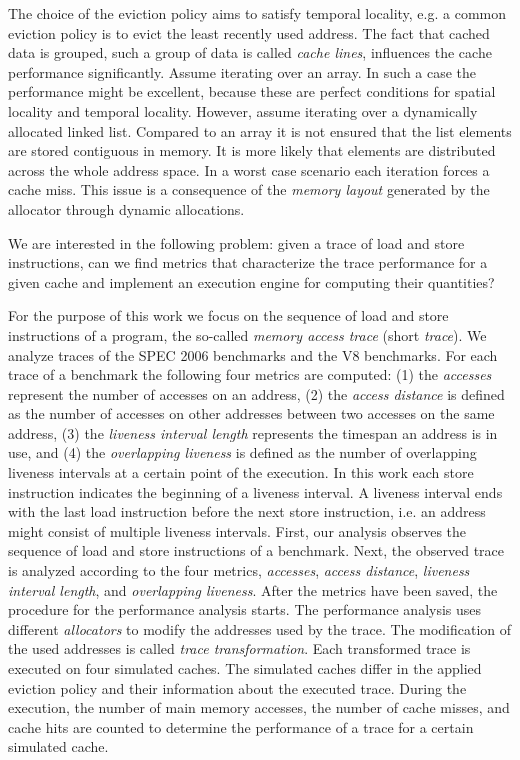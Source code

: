 \documentclass[onecolumn, openright, master, english, signatures]{dbrgrptt}
\begin{document}
The choice of the eviction policy aims to satisfy temporal locality, e.g. a common eviction policy is to evict the least recently used address.
%
The fact that cached data is grouped, such a group of data is called \emph{cache lines}, influences the cache performance significantly.
Assume iterating over an array.
In such a case the performance might be excellent, because these are perfect conditions for spatial locality and temporal locality.
However, assume iterating over a dynamically allocated linked list.
Compared to an array it is not ensured that the list elements are stored contiguous in memory.
It is more likely that elements are distributed across the whole address space.
In a worst case scenario each iteration forces a cache miss.
This issue is a consequence of the \emph{memory layout} generated by the allocator through dynamic allocations.

We are interested in the following problem: given a trace of load and store instructions, can we find metrics that characterize the trace performance for a given cache and implement an execution engine for computing their quantities?

For the purpose of this work we focus on the sequence of load and store instructions of a program, the so-called \emph{memory access trace} (short \emph{trace}).
We analyze traces of the SPEC 2006 benchmarks and the V8 benchmarks.
For each trace of a benchmark the following four metrics are computed:
(1) the \emph{accesses} represent the number of accesses on an address,
(2) the \emph{access distance} is defined as the number of accesses on other addresses between two accesses on the same address,
(3) the \emph{liveness interval length} represents the timespan an address is in use, and
(4) the \emph{overlapping liveness} is defined as the number of overlapping liveness intervals at a certain point of the execution.
In this work each store instruction indicates the beginning of a liveness interval.
A liveness interval ends with the last load instruction before the next store instruction, i.e. an address might consist of multiple liveness intervals.
%
First, our analysis observes the sequence of load and store instructions of a benchmark.
Next, the observed trace is analyzed according to the four metrics, \emph{accesses}, \emph{access distance}, \emph{liveness interval length}, and \emph{overlapping liveness}.
After the metrics have been saved, the procedure for the performance analysis starts.
The performance analysis uses different \emph{allocators} to modify the addresses used by the trace.
The modification of the used addresses is called \emph{trace transformation}.
Each transformed trace is executed on four simulated caches.
The simulated caches differ in the applied eviction policy and their information about the executed trace.
During the execution, the number of main memory accesses, the number of cache misses, and cache hits are counted to determine the performance of a trace for a certain simulated cache.
\end{document}
